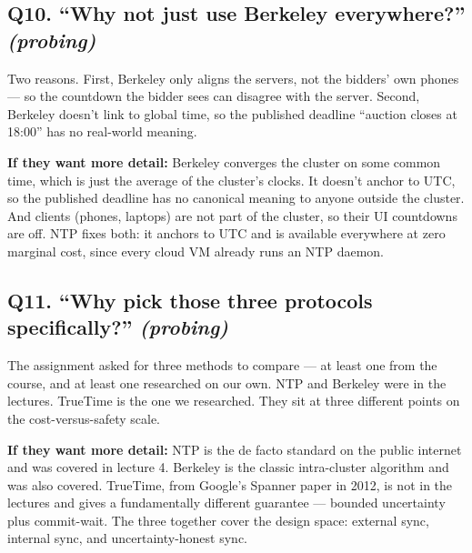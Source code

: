 \documentclass[a4paper,11pt]{article}
\begin{document}
\subsection{Q10. ``Why not just use Berkeley everywhere?'' \textnormal{\small\itshape (probing)}}

\begin{shortans}
Two reasons. First, Berkeley only aligns the servers, not the
bidders' own phones --- so the countdown the bidder sees can
disagree with the server. Second, Berkeley doesn't link to global
time, so the published deadline ``auction closes at 18:00'' has
no real-world meaning.
\end{shortans}

\begin{deepans}
\textbf{If they want more detail:} Berkeley converges the cluster
on some common time, which is just the average of the cluster's
clocks. It doesn't anchor to UTC, so the published deadline has
no canonical meaning to anyone outside the cluster. And clients
(phones, laptops) are not part of the cluster, so their UI
countdowns are off. NTP fixes both: it anchors to UTC and is
available everywhere at zero marginal cost, since every cloud VM
already runs an NTP daemon.
\end{deepans}

\subsection{Q11. ``Why pick those three protocols specifically?'' \textnormal{\small\itshape (probing)}}

\begin{shortans}
The assignment asked for three methods to compare --- at least
one from the course, and at least one researched on our own. NTP
and Berkeley were in the lectures. TrueTime is the one we
researched. They sit at three different points on the
cost-versus-safety scale.
\end{shortans}

\begin{deepans}
\textbf{If they want more detail:} NTP is the de facto standard
on the public internet and was covered in lecture 4. Berkeley is
the classic intra-cluster algorithm and was also covered.
TrueTime, from Google's Spanner paper in 2012, is not in the
lectures and gives a fundamentally different guarantee --- bounded
uncertainty plus commit-wait. The three together cover the design
space: external sync, internal sync, and uncertainty-honest sync.
\end{deepans}
\end{document}
